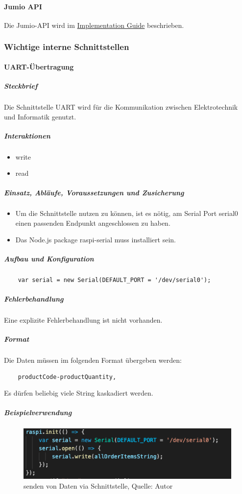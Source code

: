 \paragraph{Jumio API}
Die Jumio-API wird im \href{https://github.com/Jumio/implementation-guides}{Implementation Guide} beschrieben. 

\subsubsection{Wichtige interne Schnittstellen}
 \paragraph{UART-Übertragung}
 \subparagraph{Steckbrief}
Die Schnittstelle \ac{UART} wird für die Kommunikation zwischen Elektrotechnik und Informatik genutzt. 
\subparagraph{Interaktionen}
\begin{itemize}
	\item write
	\item read
\end{itemize}
 
 \subparagraph{Einsatz, Abläufe, Voraussetzungen und Zusicherung}
 \begin{itemize}
 	\item Um die Schnittstelle nutzen zu können, ist es nötig, am Serial Port \glqq serial0\grqq{} einen passenden Endpunkt angeschlossen zu haben.  
 	\item Das Node.js package \glqq raspi-serial\grqq{} muss installiert sein.
 \end{itemize}
 
 \subparagraph{Aufbau und Konfiguration}
 \begin{verbatim}
 	var serial = new Serial(DEFAULT_PORT = '/dev/serial0');
 \end{verbatim}
 \subparagraph{Fehlerbehandlung}
Eine explizite Fehlerbehandlung ist nicht vorhanden. 
 
 \subparagraph{Format}
 Die Daten müssen im folgenden Format übergeben werden: 
 \begin{verbatim}
 	productCode-productQuantity, 
 \end{verbatim}
 Es dürfen beliebig viele String kaskadiert werden. 
 \subparagraph{Beispielverwendung}
\begin{figure}[H]
	\centering
	\includegraphics[scale=0.6]{images/sendDataUart.png}
	\caption[Senden von Daten via Schnittstelle]{senden von Daten via Schnittstelle, Quelle: Autor}
	\label{img: send}
\end{figure}

